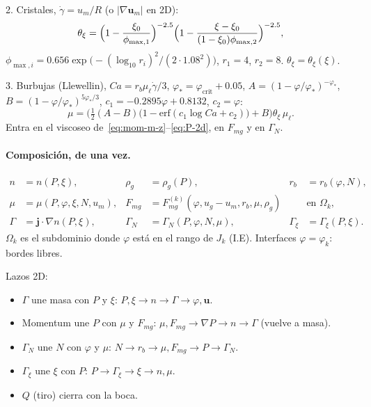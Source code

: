\documentclass[11pt,a4paper]{article}
\begin{document}
2. Cristales, $\dot\gamma=u_m/R$ (o $|\nabla\mathbf{u}_m|$
en 2D):
\begin{equation}
\label{eq:thxi-2d}
\theta_\xi
=\Bigl(1-\frac{\xi_0}{\phi_{\max,1}}\Bigr)^{-2.5}
\Bigl(1-\frac{\xi-\xi_0}{(1-\xi_0)\phi_{\max,2}}\Bigr)^{-2.5},
\end{equation}
$\phi_{\max,i}=0.656\exp\bigl(-(\log_{10}r_i)^2/(2\cdot1.08^2)\bigr)$,
$r_1=4$, $r_2=8$. $\theta_\xi=\theta_\xi(\xi)$.

3. Burbujas (Llewellin), $Ca=r_b\mu_\ell\dot\gamma/3$,
$\varphi_\ast=\varphi_{\mathrm{crit}}+0.05$,
$A=(1-\varphi/\varphi_\ast)^{-\varphi_\ast}$,
$B=(1-\varphi/\varphi_\ast)^{5\varphi_\ast/3}$,
$c_1=-0.2895\varphi+0.8132$, $c_2=\varphi$:
\begin{equation}
\label{eq:mu-2d}
\mu
=\Biggl(\tfrac12(A-B)\bigl(1-\mathrm{erf}(c_1\log Ca+c_2)\bigr)+B\Biggr)
\theta_\xi\,\mu_\ell.
\end{equation}
Entra en el viscoseo de~\eqref{eq:mom-m-z}--\eqref{eq:P-2d},
en $F_{mg}$ y en $\Gamma_N$.

\paragraph{Composición, de una vez.}
\begin{equation}
\label{eq:acop-2d}
\begin{aligned}
n&=n(P,\xi),
&
\rho_g&=\rho_g(P),
&
r_b&=r_b(\varphi,N),
\\
\mu&=\mu(P,\varphi,\xi,N,u_m),
&
F_{mg}&=F_{mg}^{(k)}(\varphi,u_g-u_m,r_b,\mu,\rho_g)
&&\text{en }\Omega_k,
\\
\Gamma&=\mathbf{j}\cdot\nabla n(P,\xi),
&
\Gamma_N&=\Gamma_N(P,\varphi,N,\mu),
&
\Gamma_\xi&=\Gamma_\xi(P,\xi).
\end{aligned}
\end{equation}
$\Omega_k$ es el subdominio donde $\varphi$ está en el rango
de $J_k$ (I.E). Interfaces $\varphi=\varphi_k$: bordes libres.

Lazos 2D:
\begin{itemize}
\item $\Gamma$ une masa con $P$ y $\xi$:
  $P,\xi\to n\to\Gamma\to\varphi,\mathbf{u}$.
\item Momentum une $P$ con $\mu$ y $F_{mg}$:
  $\mu,F_{mg}\to\nabla P\to n\to\Gamma$ (vuelve a masa).
\item $\Gamma_N$ une $N$ con $\varphi$ y $\mu$:
  $N\to r_b\to\mu,F_{mg}\to P\to\Gamma_N$.
\item $\Gamma_\xi$ une $\xi$ con $P$:
  $P\to\Gamma_\xi\to\xi\to n,\mu$.
\item $Q$ (tiro) cierra con la boca.
\end{itemize}
\end{document}
